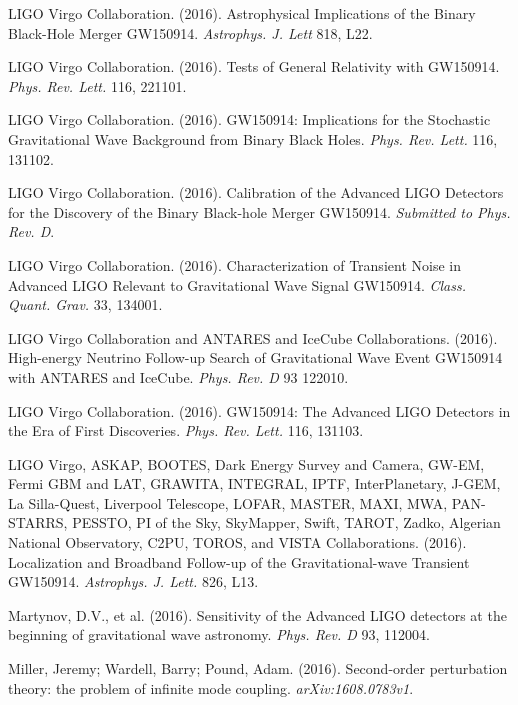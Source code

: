 LIGO Virgo Collaboration. (2016). Astrophysical Implications of the Binary Black-Hole Merger GW150914. {\em Astrophys. J. Lett} 818, L22.

LIGO Virgo Collaboration. (2016). Tests of General Relativity with GW150914. {\em Phys. Rev. Lett.} 116, 221101.
  
LIGO Virgo Collaboration. (2016). GW150914: Implications for the Stochastic Gravitational Wave Background from Binary Black Holes. {\em Phys. Rev. Lett.} 116, 131102.

LIGO Virgo Collaboration. (2016). Calibration of the Advanced LIGO Detectors for the Discovery of the Binary Black-hole Merger GW150914. {\em Submitted to Phys. Rev. D}.

LIGO Virgo Collaboration. (2016). Characterization of Transient Noise in Advanced LIGO Relevant to Gravitational Wave Signal GW150914. {\em Class. Quant. Grav.} 33, 134001.

LIGO Virgo Collaboration and ANTARES and IceCube Collaborations. (2016). High-energy Neutrino Follow-up Search of Gravitational Wave Event GW150914 with ANTARES and IceCube. {\em Phys. Rev. D} 93 122010. 

LIGO Virgo Collaboration. (2016). GW150914: The Advanced LIGO Detectors in the Era of First Discoveries. {\em Phys. Rev. Lett.} 116, 131103.

LIGO Virgo, ASKAP, BOOTES, Dark Energy Survey and Camera, GW-EM, Fermi GBM and LAT, GRAWITA, INTEGRAL, IPTF, InterPlanetary, J-GEM, La Silla-Quest, Liverpool Telescope, LOFAR, MASTER, MAXI, MWA, PAN-STARRS, PESSTO, PI of the Sky, SkyMapper, Swift, TAROT, Zadko, Algerian National Observatory, C2PU, TOROS, and VISTA Collaborations. (2016). Localization and Broadband Follow-up of the Gravitational-wave Transient GW150914. {\em Astrophys. J. Lett.} 826, L13.
  

Martynov, D.V., et al. (2016). Sensitivity of the Advanced LIGO detectors at the beginning of gravitational wave astronomy. {\em Phys. Rev. D} 93, 112004.

Miller, Jeremy; Wardell, Barry; Pound, Adam. (2016). Second-order perturbation theory: the problem of infinite mode coupling. {\em arXiv:1608.0783v1}.



